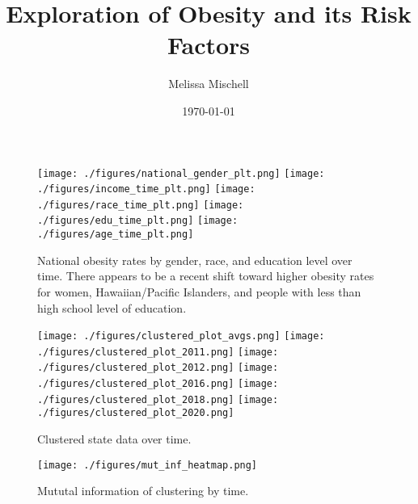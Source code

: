 \documentclass[11pt]{article}
\title{Exploration of Obesity and its Risk Factors}
\author{Melissa Mischell}
\date{\today}
\begin{document}
\maketitle

\begin{figure}[hp]
\texttt{[image: ./figures/national\_gender\_plt.png]}
\texttt{[image: ./figures/income\_time\_plt.png]}
\texttt{[image: ./figures/race\_time\_plt.png]}
\texttt{[image: ./figures/edu\_time\_plt.png]}
\texttt{[image: ./figures/age\_time\_plt.png]}
\caption{
  National obesity rates by gender, race, and education level over time. There appears to be a recent shift toward higher obesity rates for women, Hawaiian/Pacific Islanders, and people with less than high school level of education. 
}
\label{fig:dems_by_time}
\end{figure}

\begin{figure}[hp]
\texttt{[image: ./figures/clustered\_plot\_avgs.png]}
\texttt{[image: ./figures/clustered\_plot\_2011.png]}
\texttt{[image: ./figures/clustered\_plot\_2012.png]}
\texttt{[image: ./figures/clustered\_plot\_2016.png]}
\texttt{[image: ./figures/clustered\_plot\_2018.png]}
\texttt{[image: ./figures/clustered\_plot\_2020.png]}
\caption{
  Clustered state data over time.
}
\label{fig:clustered_data}
\end{figure}

\begin{figure}[hp]
\texttt{[image: ./figures/mut\_inf\_heatmap.png]}
\caption{
  Mututal information of clustering by time. 
}
\label{fig:mut_inf}
\end{figure}
\end{document}
